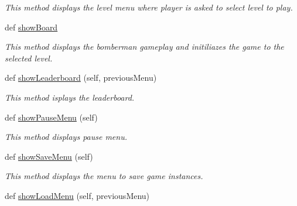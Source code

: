 \begin{DoxyCompactItemize}
\begin{DoxyCompactList}\small\item\em This method displays the level menu where player is asked to select level to play. \end{DoxyCompactList}\item 
def \hyperlink{classsrc_1_1game_1_1_game_a570dba568ad9dd3b9745e0f10a4b29a8}{show\+Board}
\begin{DoxyCompactList}\small\item\em This method displays the bomberman gameplay and initiliazes the game to the selected level. \end{DoxyCompactList}\item 
\hypertarget{classsrc_1_1game_1_1_game_a13a6d564b3397c8c520b0b23e99d0880}{}def \hyperlink{classsrc_1_1game_1_1_game_a13a6d564b3397c8c520b0b23e99d0880}{show\+Leaderboard} (self, previous\+Menu)\label{classsrc_1_1game_1_1_game_a13a6d564b3397c8c520b0b23e99d0880}

\begin{DoxyCompactList}\small\item\em This method isplays the leaderboard. \end{DoxyCompactList}\item 
\hypertarget{classsrc_1_1game_1_1_game_a0e17658d314189179aa5be0bfdc185da}{}def \hyperlink{classsrc_1_1game_1_1_game_a0e17658d314189179aa5be0bfdc185da}{show\+Pause\+Menu} (self)\label{classsrc_1_1game_1_1_game_a0e17658d314189179aa5be0bfdc185da}

\begin{DoxyCompactList}\small\item\em This method displays pause menu. \end{DoxyCompactList}\item 
\hypertarget{classsrc_1_1game_1_1_game_a02ee6b88570e0af0686050a2268f687b}{}def \hyperlink{classsrc_1_1game_1_1_game_a02ee6b88570e0af0686050a2268f687b}{show\+Save\+Menu} (self)\label{classsrc_1_1game_1_1_game_a02ee6b88570e0af0686050a2268f687b}

\begin{DoxyCompactList}\small\item\em This method displays the menu to save game instances. \end{DoxyCompactList}\item 
\hypertarget{classsrc_1_1game_1_1_game_a4c38f9b4c2f4e81a49e25632dccd8622}{}def \hyperlink{classsrc_1_1game_1_1_game_a4c38f9b4c2f4e81a49e25632dccd8622}{show\+Load\+Menu} (self, previous\+Menu)\label{classsrc_1_1game_1_1_game_a4c38f9b4c2f4e81a49e25632dccd8622}


\end{DoxyCompactItemize}
